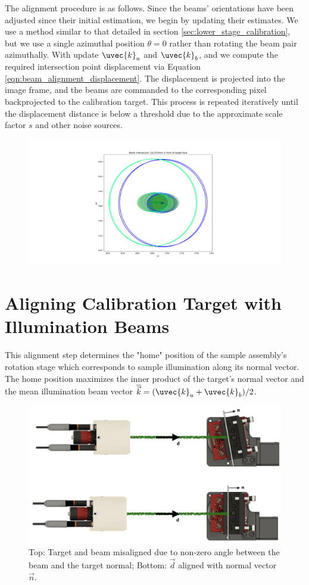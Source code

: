 The alignment procedure is as follows. Since the beams' orientations have been adjusted since their initial estimation, we begin by updating their estimates. We use a method similar to that detailed in section \ref{sec:lower_stage_calibration}, but we use a single azimuthal position $\theta = 0$ rather than rotating the beam pair azimuthally. With update $\uvec{k}_a$ and $\uvec{k}_b$, and we compute the required intersection point displacement via Equation \ref{eqn:beam_alignment_displacement}. The displacement is projected into the image frame, and the beams are commanded to the corresponding pixel backprojected to the calibration target. This process is repeated iteratively until the displacement distance is below a threshold due to the approximate scale factor $s$ and other noise sources.
%
\begin{figure}  %
    \centering
    \includegraphics[width=\linewidth]{../figures/beam_overlap.png}
    \caption{}
    \label{fig:beam_overlap}
\end{figure}

\section{Aligning Calibration Target with Illumination Beams}
This alignment step determines the "home" position of the sample assembly's rotation stage which corresponds to sample illumination along its normal vector. The home position maximizes the inner product of the target's normal vector and the mean illumination beam vector $\overline{\vec{k}} = (\uvec{k}_a + \uvec{k}_b)/2$.
\begin{figure}
    \centering
    \includegraphics[width=0.5\linewidth]{../figures/target_alignment.png}
    \caption{Top: Target and beam misaligned due to non-zero angle between the beam and the target normal; Bottom: $\vec{d}$ aligned with normal vector $\vec{n}$. }
    \label{fig:sample_beam_alignment}
\end{figure}

